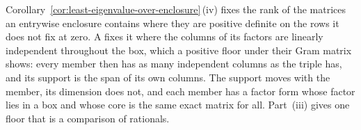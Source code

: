 
Corollary~\ref{cor:least-eigenvalue-over-enclosure}\,(iv) fixes the rank of
the matrices an entrywise enclosure contains where they are positive definite
on the rows it does not fix at zero. A  fixes it where
the columns of its factors are linearly independent throughout the box, which
a positive floor under their Gram matrix shows: every member then has as many
independent columns as the triple has, and its support is the span of its own
columns. The support moves with the member, its dimension does not, and each
member has a factor form whose factor lies in a box and whose core is the same
exact matrix for all. Part~(iii) gives one floor that is a comparison of
rationals.


